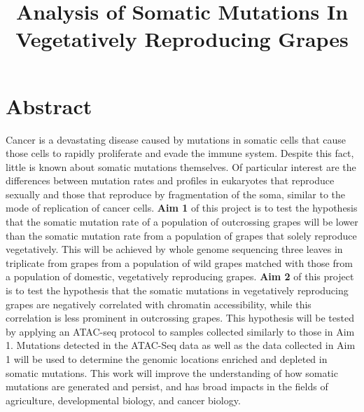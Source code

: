\documentclass[12pt]{article}
\title{Analysis of Somatic Mutations In Vegetatively Reproducing Grapes}
\date{}
\begin{document}
\maketitle





\section{Abstract}
Cancer is a devastating disease caused by mutations in somatic cells that cause those cells to rapidly proliferate and evade the immune system. Despite this fact, little is known about somatic mutations themselves. Of particular interest are the differences between mutation rates and profiles in eukaryotes that reproduce sexually and those that reproduce by fragmentation of the soma, similar to the mode of replication of cancer cells.
\textbf{Aim 1} of this project is to test the hypothesis that the somatic mutation rate of a population of outcrossing grapes will be lower than the somatic mutation rate from a population of grapes that solely reproduce vegetatively.
This will be achieved by whole genome sequencing three leaves in triplicate from grapes from a population of wild grapes matched with those from a population of domestic, vegetatively reproducing grapes.
\textbf{Aim 2} of this project is to test the hypothesis that the somatic mutations in vegetatively reproducing grapes are negatively correlated with chromatin accessibility, while this correlation is less prominent in outcrossing grapes.
This hypothesis will be tested by applying an ATAC-seq protocol to samples collected similarly to those in Aim 1. Mutations detected in the ATAC-Seq data as well as the data collected in Aim 1 will be used to determine the genomic locations enriched and depleted in somatic mutations.
This work will improve the understanding of how somatic mutations are generated and persist, and has broad impacts in the fields of agriculture, developmental biology, and cancer biology.
\end{document}
